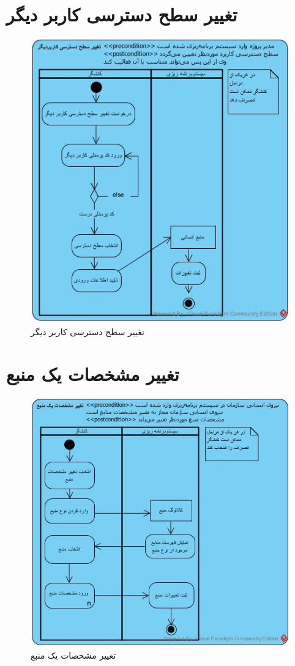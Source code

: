\section{تغییر سطح دسترسی کاربر دیگر}
\begin{figure}[H]
	\centering
	\includegraphics[scale=0.8]{img/activity/ChangeAccessLevel}
	\caption{تغییر سطح دسترسی کاربر دیگر}
\end{figure}


\section{تغییر مشخصات یک منبع}
\begin{figure}[H]
	\centering
	\includegraphics[scale=0.9]{img/activity/EditResourceAttributes}
	\caption{تغییر مشخصات یک منبع}
\end{figure}


